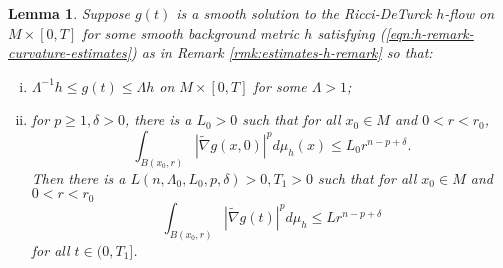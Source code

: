 \documentclass[12pt]{amsart}
\theoremstyle{plain}
\theoremstyle{plain}
\newtheorem{lemma}[subsection]{Lemma}
\theoremstyle{definition}
\theoremstyle{remark}
\numberwithin{equation}{subsection}
\newcommand{\hdel}{\tilde{\nabla}}
\begin{document}
\begin{lemma}\label{lem:morrey-preservation}
    Suppose $g(t)$ is a smooth solution to the Ricci-DeTurck $h$-flow on $M \times [0, T]$ for some smooth background metric $h$ satisfying (\ref{eqn:h-remark-curvature-estimates}) as in Remark \ref{rmk:estimates-h-remark} so that:
    \begin{enumerate}[(i)]
        \item $\Lambda^{-1}h \leq g(t) \leq \Lambda h$ on $M\times[0,T]$ for some $\Lambda > 1$;
        \item for $p \geq 1, \delta > 0$, there is a $L_0 > 0$ such that for all $x_0 \in M$ and $0 < r < r_0$,
        \begin{equation*}
            \int_{B(x_0,r)} |\hdel g(x,0)|^p d\mu_h(x) \leq L_0 r^{n-p+\delta}.
        \end{equation*}
        Then there is a $L(n,\Lambda_0,L_0,p,\delta) > 0, T_1 > 0$ such that for all $x_0 \in M$ and $0 < r < r_0$
        \begin{equation*}
            \int_{B(x_0,r)} |\hdel g(t)|^p d\mu_h \leq L r^{n-p+\delta}
        \end{equation*}
        for all $t \in (0, T_1]$.
    \end{enumerate}
\end{lemma}
\end{document}
